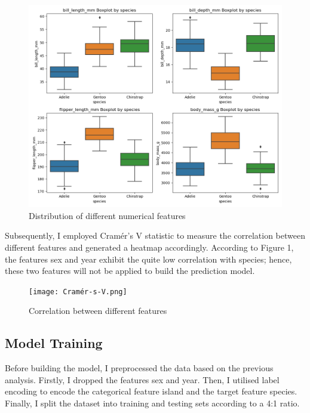 \documentclass[a4paper,11pt]{article}
\begin{document}
\begin{figure}[htbp]
    \centering
    \includegraphics[scale=0.45]{numerical-features}
    \caption{Distribution of different numerical features}
    \label{fig:numerical-features}
\end{figure}
\noindent

\noindent
Subsequently, I employed Cramér's V statistic to measure the correlation between different features and generated a heatmap accordingly.
According to Figure 1, the features sex and year exhibit the quite low correlation with species; hence, these two features 
will not be applied to build the prediction model.


\begin{figure}[htbp]
    \centering
    \texttt{[image: Cramér-s-V.png]}
    \caption{Correlation between different features}
    \label{fig: }
\end{figure}

\subsection{Model Training}

Before building the model, I preprocessed the data based on the previous analysis. Firstly, I dropped the features sex and year. Then, 
I utilised label encoding to encode the categorical feature island and the target feature species. Finally, I split the dataset into 
training and testing sets according to a 4:1 ratio. 
\end{document}

